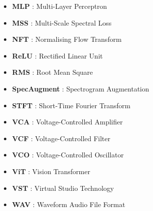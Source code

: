 \begin{itemize}
    \item \textbf{MLP} : Multi-Layer Perceptron
    \item \textbf{MSS} : Multi-Scale Spectral Loss
    \item \textbf{NFT} : Normalising Flow Transform
    \item \textbf{ReLU} : Rectified Linear Unit
    \item \textbf{RMS} : Root Mean Square
    \item \textbf{SpecAugment} : Spectrogram Augmentation
    \item \textbf{STFT} : Short-Time Fourier Transform
    \item \textbf{VCA} : Voltage-Controlled Amplifier
    \item \textbf{VCF} : Voltage-Controlled Filter
    \item \textbf{VCO} : Voltage-Controlled Oscillator
    \item \textbf{ViT} : Vision Transformer
    \item \textbf{VST} : Virtual Studio Technology
    \item \textbf{WAV} : Waveform Audio File Format
\end{itemize}
